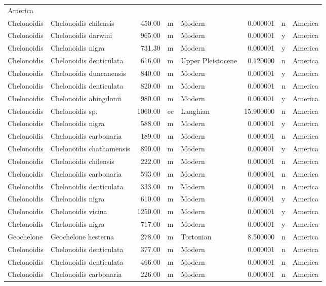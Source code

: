 \begin{landscape}
\begin{longtable}[]{@{}llrllrll@{}}
	America\tabularnewline
	Chelonoidis & Chelonoidis chilensis & 450.00 & m & Modern & 0.000001 & n
	& America\tabularnewline
	Chelonoidis & Chelonoidis darwini & 965.00 & m & Modern & 0.000001 & y &
	America\tabularnewline
	Chelonoidis & Chelonoidis nigra & 731.30 & m & Modern & 0.000001 & y &
	America\tabularnewline
	Chelonoidis & Chelonoidis denticulata & 616.00 & m & Upper Pleistocene &
	0.120000 & n & America\tabularnewline
	Chelonoidis & Chelonoidis duncanensis & 840.00 & m & Modern & 0.000001 &
	y & America\tabularnewline
	Chelonoidis & Chelonoidis denticulata & 820.00 & m & Modern & 0.000001 &
	n & America\tabularnewline
	Chelonoidis & Chelonoidis abingdonii & 980.00 & m & Modern & 0.000001 &
	y & America\tabularnewline
	Chelonoidis & Chelonoidis sp. & 1060.00 & ec & Langhian & 15.900000 & n
	& America\tabularnewline
	Chelonoidis & Chelonoidis nigra & 588.00 & m & Modern & 0.000001 & y &
	America\tabularnewline
	Chelonoidis & Chelonoidis carbonaria & 189.00 & m & Modern & 0.000001 &
	n & America\tabularnewline
	Chelonoidis & Chelonoidis chathamensis & 890.00 & m & Modern & 0.000001
	& y & America\tabularnewline
	Chelonoidis & Chelonoidis chilensis & 222.00 & m & Modern & 0.000001 & n
	& America\tabularnewline
	Chelonoidis & Chelonoidis carbonaria & 593.00 & m & Modern & 0.000001 &
	n & America\tabularnewline
	Chelonoidis & Chelonoidis denticulata & 333.00 & m & Modern & 0.000001 &
	n & America\tabularnewline
	Chelonoidis & Chelonoidis nigra & 610.00 & m & Modern & 0.000001 & y &
	America\tabularnewline
	Chelonoidis & Chelonoidis vicina & 1250.00 & m & Modern & 0.000001 & y &
	America\tabularnewline
	Chelonoidis & Chelonoidis nigra & 717.00 & m & Modern & 0.000001 & y &
	America\tabularnewline
	Geochelone & Geochelone hesterna & 278.00 & m & Tortonian & 8.500000 & n
	& America\tabularnewline
	Chelonoidis & Chelonoidis denticulata & 377.00 & m & Modern & 0.000001 &
	n & America\tabularnewline
	Chelonoidis & Chelonoidis denticulata & 466.00 & m & Modern & 0.000001 &
	n & America\tabularnewline
	Chelonoidis & Chelonoidis carbonaria & 226.00 & m & Modern & 0.000001 &
	n & America\tabularnewline
	\bottomrule
\end{longtable}

\end{landscape}